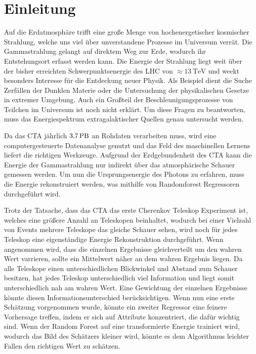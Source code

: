 \chapter{Einleitung}

Auf die Erdatmosphäre trifft eine große Menge von hochenergetischer kosmischer Strahlung, welche uns viel über unverstandene
Prozesse im Universum verrät.
Die Gammastrahlung gelangt auf direktem Weg zur Erde, wodurch ihr Entstehungsort erfasst werden kann.
Die Energie der Strahlung liegt weit über der bisher erreichten Schwerpunktsenergie des LHC von $\approx\SI{13}{\tera\eV}$\cite{LHC} und weckt
besonders Interesse für die Entdeckung neuer Physik.
Als Beispiel dient die Suche Zerfällen der Dunklen Materie oder die Untersuchung der physikalischen Gesetze in extremer Umgebung.
Auch ein Großteil der Beschleunigungsprozesse von Teilchen im Universum ist noch nicht erklärt.
Um diese Fragen zu beantworten, muss das Energiespektrum extragalaktischer Quellen genau untersucht werden.

Da das CTA jährlich $\SI{3.7}{\peta\byte}$\cite{Rohdaten} an Rohdaten verarbeiten muss, wird eine computergesteuerte Datenanalyse
genutzt und das Feld des maschinellen Lernens liefert die richtigen Werkzeuge.
Aufgrund der Erdgebundenheit des CTA kann die Energie der Gammastrahlung nur indirekt über das atmosphärische Schauer gemessen
werden.
Um nun die Ursprungsenergie des Photons zu erfahren, muss die Energie rekonstruiert werden, was mithilfe von Randomforest
Regressoren durchgeführt wird.

Trotz der Tatsache, dass das CTA das erste Cherenkov Teleskop Experiment ist, welches eine größere Anzahl an Teleskopen beinhaltet,
wodurch bei einer Vielzahl von Events mehrere Teleskope das gleiche Schauer sehen, wird noch für jedes Teleskop eine eigenständige
Energie Rekonstruktion durchgeführt.
Wenn angenommen wird, dass die einzelnen Ergebnisse gleichverteilt um den wahren Wert varrieren, sollte ein Mittelwert näher an dem wahren
Ergebnis liegen.
Da alle Teleskope einen unterschiedlichen Blickwinkel und Abstand zum Schauer besitzen, hat jedes Teleskop unterschiedlich viel Information und liegt somit
unterschiedlich nah am wahren Wert.
Eine Gewichtung der einzelnen Ergebnisse könnte diesen Informationsunterschied berücksichtigen.
Wenn nun eine erste Schätzung vorgenommen wurde, könnte ein zweiter Regressor eine feinere Vorhersage treffen, indem er sich auf Attribute konzentriert, die
dafür wichtig sind.
Wenn der Random Forest auf eine transformierte Energie trainiert wird, wodurch das Bild des Schätzers kleiner wird, könnte es dem
Algorithmus leichter Fallen den richtigen Wert zu schätzen.

